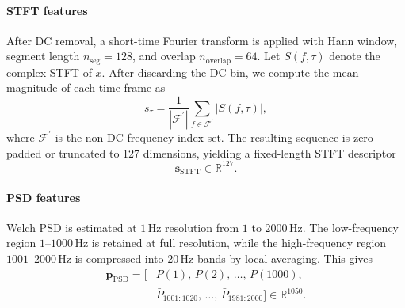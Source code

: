 \documentclass[preprint,12pt,3p]{elsarticle}
\newcommand{\R}{\mathbb{R}}
\begin{document}
\paragraph{STFT features}
After DC removal, a short-time Fourier transform is applied with
Hann window, segment length $n_\mathrm{seg}=128$, and overlap
$n_\mathrm{overlap}=64$. Let $S(f,\tau)$ denote the complex STFT of
$\bar{x}$. After discarding the DC bin, we compute the mean magnitude
of each time frame as
\begin{equation}
  s_\tau = \frac{1}{|\mathcal{F}^\prime|}
  \sum_{f \in \mathcal{F}^\prime} |S(f,\tau)|,
\end{equation}
where $\mathcal{F}^\prime$ is the non-DC frequency index set. The
resulting sequence is zero-padded or truncated to 127 dimensions,
yielding a fixed-length STFT descriptor
\begin{equation}
\mathbf{s}_{\mathrm{STFT}} \in \R^{127}.
\end{equation}

\paragraph{PSD features}
Welch PSD is estimated at $1$\,Hz resolution from $1$ to $2000$\,Hz.
The low-frequency region $1$--$1000$\,Hz is retained at full
resolution, while the high-frequency region $1001$--$2000$\,Hz is
compressed into 20\,Hz bands by local averaging. This gives
\begin{equation}
\begin{aligned}
\mathbf{p}_{\mathrm{PSD}}
=
\bigl[
&P(1),\,P(2),\,\dots,\,P(1000),\\
&\bar{P}_{1001{:}1020},\,\dots,\,\bar{P}_{1981{:}2000}
\bigr]
\in \R^{1050}.
\label{eq:welch}
\end{aligned}
\end{equation}
\end{document}
